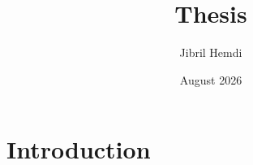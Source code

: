 \documentclass{article}
\title{Thesis}
\author{Jibril Hemdi}
\date{August 2026}
\begin{document}
\maketitle

\section{Introduction}
\end{document}
